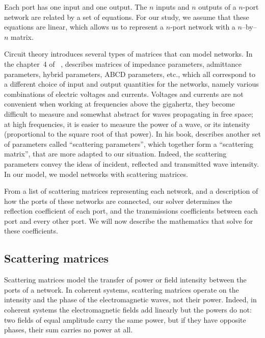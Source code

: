 Each port has one input and one output.
The $n$ inputs and $n$ outputs of a $n$-port network are related by a set of equations.
For our study, we assume that these equations are linear,
which allows us to represent a $n$-port network with a $n$--by--$n$ matrix.

Circuit theory introduces several types of matrices that can model networks.
In the chapter~4 of ~\cite{pozar2009microwave},
\citeauthor{pozar2009microwave} describes matrices of impedance parameters, admittance parameters, hybrid parameters, ABCD parameters, etc., which all correspond to a different choice of input and output quantities for the networks, namely various combinations of electric voltages and currents.
Voltages and currents are not convenient when working at frequencies above the gigahertz, they become difficult to measure and somewhat abstract for waves propagating in free space;
at high frequencies, it is easier to measure the power of a wave, or its intensity (proportional to the square root of that power).
In his book, \citeauthor{pozar2009microwave} describes another set of parameters called ``scattering parameters'', which together form a ``scattering matrix'', that are more adapted to our situation.
Indeed, the scattering parameters convey the ideas of incident, reflected and transmitted wave intensity.
In our model, we model networks with scattering matrices.

From a list of scattering matrices representing each network, and a description of how the ports of these networks are connected, our solver determines the reflection coefficient of each port, and the transmissions coefficients between each port and every other port.
We will now describe the mathematics that solve for these coefficients.






\subsection{Scattering matrices}

Scattering matrices \cite{pozar2009microwave,siegman1986lasers} model the transfer of power or field intensity between the ports of a network.
In coherent systems, scattering matrices operate on the intensity and the phase of the electromagnetic waves, not their power.
Indeed, in coherent systems the electromagnetic fields add linearly but the powers do not: two fields of equal amplitude carry the same power, but if they have opposite phases, their sum carries no power at all.

